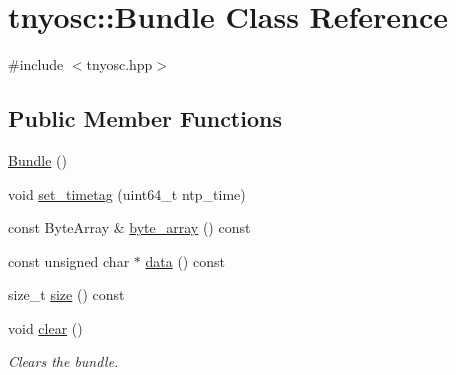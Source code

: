 \hypertarget{classtnyosc_1_1_bundle}{
\section{tnyosc::Bundle Class Reference}
\label{classtnyosc_1_1_bundle}
}


{\ttfamily \#include $<$tnyosc.hpp$>$}

\subsection*{Public Member Functions}
\begin{DoxyCompactItemize}
\item 
\hyperlink{classtnyosc_1_1_bundle_a7075e725afb3941ed1af164d4f4f656f}{Bundle} ()
\item 
void \hyperlink{classtnyosc_1_1_bundle_aecc352135263bd0c1984818d342c09b5}{set\_\-timetag} (uint64\_\-t ntp\_\-time)
\item 
const ByteArray \& \hyperlink{classtnyosc_1_1_bundle_a115f4db940bb1a04cd9a2c60fdaa039f}{byte\_\-array} () const 
\item 
const unsigned char $\ast$ \hyperlink{classtnyosc_1_1_bundle_a1df649f2cd0748a7159ea3081dae42b2}{data} () const 
\item 
size\_\-t \hyperlink{classtnyosc_1_1_bundle_ae172d6cdb7440822f84291c8b96fb00d}{size} () const 
\item 
\hypertarget{classtnyosc_1_1_bundle_a58ad8eb671f250bc3fa524007f741254}{
void \hyperlink{classtnyosc_1_1_bundle_a58ad8eb671f250bc3fa524007f741254}{clear} ()}
\label{classtnyosc_1_1_bundle_a58ad8eb671f250bc3fa524007f741254}

\begin{DoxyCompactList}\small\item\em Clears the bundle. \end{DoxyCompactList}\end{DoxyCompactItemize}

